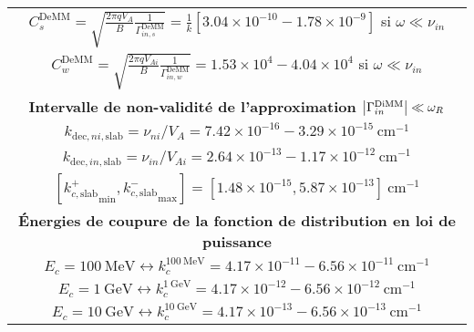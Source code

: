 \documentclass[10pt,a4paper]{article}
\begin{document}
\begin{center}
\begin{tabular}{|c|}
$C^\mathrm{DeMM}_s = \sqrt{\frac{2\pi qV_A}{B} \frac{1}{\Gamma^\mathrm{DeMM}_{in,s}}} = \frac{1}{k} [ 3.04 \times 10^{-10} - 1.78 \times 10^{-9} ]$ si $\omega \ll \nu_{in}$ \\ 
$C^\mathrm{DeMM}_w = \sqrt{\frac{2\pi qV_{Ai}}{B} \frac{1}{\Gamma^\mathrm{DeMM}_{in,w}}} = 1.53\times 10^4 - 4.04 \times 10^4$ si $\omega \ll \nu_{in}$ \\ 
\hline 
\hline
\bf{Intervalle de non-validité de l'approximation $\abs{\Gamma^\mathrm{DiMM}_{in}} \ll \omega_R$} \\ 
\hline
$k_{\mathrm{dec},ni,\mathrm{slab}} = \nu_{ni}/V_A = 7.42\times 10^{-16} - 3.29 \times 10^{-15} ~ \mathrm{cm}^{-1}$ \\ 
$k_{\mathrm{dec},in,\mathrm{slab}} = \nu_{in}/V_{Ai} = 2.64\times 10^{-13} - 1.17 \times 10^{-12} ~ \mathrm{cm}^{-1}$ \\ 
$\left[{k^+_{c,\mathrm{slab}}}_\mathrm{min}, {k^-_{c,\mathrm{slab}}}_\mathrm{max} \right] = [1.48 \times 10^{-15}, 5.87\times 10^{-13}] ~ \mathrm{cm}^{-1}$ \\ 
\hline
\hline
\bf{Énergies de coupure de la fonction de distribution en loi de puissance} \\ 
\hline
$E_c = 100~\mathrm{MeV} \leftrightarrow k^{100~\mathrm{MeV}}_c = 4.17\times 10^{-11} - 6.56 \times 10^{-11}~\mathrm{cm}^{-1}$ \\ 
$E_c = 1~\mathrm{GeV} \leftrightarrow k^{1~\mathrm{GeV}}_c = 4.17\times 10^{-12} - 6.56 \times 10^{-12} ~\mathrm{cm}^{-1}$     \\ 
$E_c = 10~\mathrm{GeV} \leftrightarrow k^{10~\mathrm{GeV}}_c = 4.17\times 10^{-13} - 6.56 \times 10^{-13}~\mathrm{cm}^{-1}$   \\ 
\hline

\end{tabular}
\label{param_DeMM}




\end{center}
\end{document}
